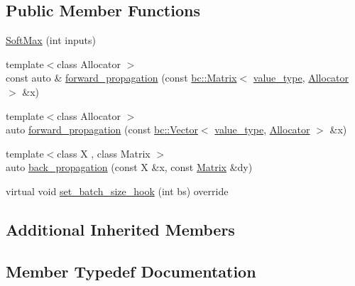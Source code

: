 \subsection*{Public Member Functions}
\begin{DoxyCompactItemize}
\item 
\hyperlink{structbc_1_1nn_1_1SoftMax_adb6fc880a69498f69e276f25adc24666}{Soft\+Max} (int inputs)
\item 
{\footnotesize template$<$class Allocator $>$ }\\const auto \& \hyperlink{structbc_1_1nn_1_1SoftMax_adab9740cba584dbda141a1324ffae83e}{forward\+\_\+propagation} (const \hyperlink{namespacebc_a92dd1e243183b382432a5fac3ed8b89f}{bc\+::\+Matrix}$<$ \hyperlink{structbc_1_1nn_1_1SoftMax_a7e53ef1c3b39ca65afa99d237b9353fa}{value\+\_\+type}, \hyperlink{classbc_1_1allocators_1_1Allocator}{Allocator} $>$ \&x)
\item 
{\footnotesize template$<$class Allocator $>$ }\\auto \hyperlink{structbc_1_1nn_1_1SoftMax_a1cbc897440f74d9ef44179e3e3857afb}{forward\+\_\+propagation} (const \hyperlink{namespacebc_a14d40e8e95957f92a57853921837a15d}{bc\+::\+Vector}$<$ \hyperlink{structbc_1_1nn_1_1SoftMax_a7e53ef1c3b39ca65afa99d237b9353fa}{value\+\_\+type}, \hyperlink{classbc_1_1allocators_1_1Allocator}{Allocator} $>$ \&x)
\item 
{\footnotesize template$<$class X , class Matrix $>$ }\\auto \hyperlink{structbc_1_1nn_1_1SoftMax_a61b74940e2e55753f7409cfd4af87c5c}{back\+\_\+propagation} (const X \&x, const \hyperlink{namespacebc_a92dd1e243183b382432a5fac3ed8b89f}{Matrix} \&dy)
\item 
virtual void \hyperlink{structbc_1_1nn_1_1SoftMax_a0c4652a0da9f1d44e23d8856ca7b8278}{set\+\_\+batch\+\_\+size\+\_\+hook} (int bs) override
\end{DoxyCompactItemize}
\subsection*{Additional Inherited Members}


\subsection{Member Typedef Documentation}
\mbox{\label{structbc_1_1nn_1_1SoftMax_acb201cfe27da9360a1b121e7d9ab190a}} 
